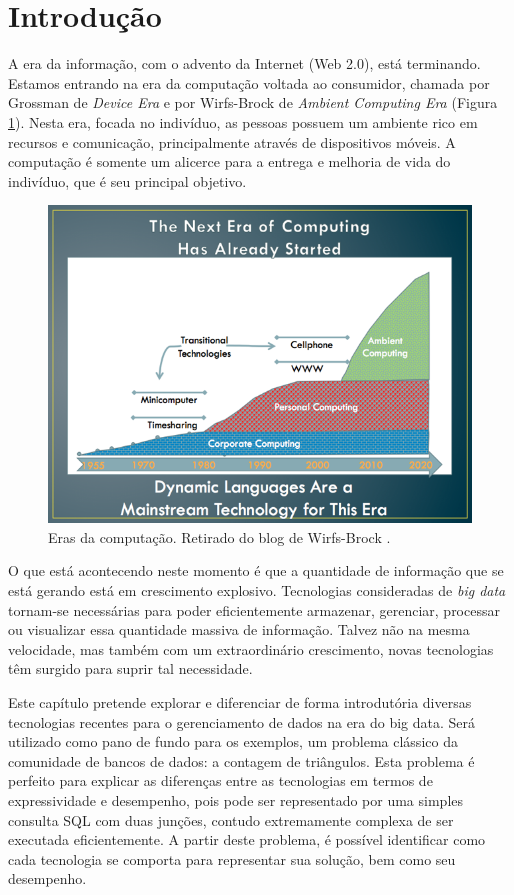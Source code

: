 \section{Introdução}

A era da informação, com o advento da Internet (Web 2.0), está terminando. Estamos entrando na
era da computação voltada ao consumidor, chamada por Grossman de \textit{Device Era}
\citep{grossman2012structure} e por Wirfs-Brock de 
\emph{Ambient Computing Era} \citep{wirfsbrock2011blog} (Figura \ref{fig:ambientcomputing_era}). 
Nesta era, focada no indivíduo, as pessoas possuem um ambiente rico em recursos e comunicação, 
principalmente através de dispositivos móveis. A computação é somente um alicerce para a entrega 
e melhoria de vida do indivíduo, que é seu principal objetivo.

\begin{figure}[h]
        \centering
        \includegraphics[width=0.7\linewidth]{3eras-medium.png}
        \caption{Eras da computação. Retirado do blog de Wirfs-Brock \citep{wirfsbrock2011blog}.}
        \label{fig:ambientcomputing_era}
\end{figure}


O que está acontecendo neste momento é que a quantidade de informação que se está gerando 
está em crescimento explosivo. Tecnologias consideradas de \emph{big data} tornam-se 
necessárias para poder eficientemente armazenar, gerenciar, processar ou
visualizar essa quantidade massiva de informação. Talvez não na mesma velocidade, mas 
também com um extraordinário crescimento, novas tecnologias têm surgido para suprir tal
necessidade.

Este capítulo pretende explorar e diferenciar de forma introdutória diversas tecnologias recentes
para o gerenciamento de dados na era do big data. Será utilizado como pano de fundo para os
exemplos, um problema clássico da comunidade de bancos de dados: a contagem de triângulos.
Esta problema é perfeito para explicar as diferenças entre as tecnologias em termos de
expressividade e desempenho, pois pode ser representado por uma simples consulta SQL com
duas junções, contudo extremamente complexa de ser executada eficientemente. A partir deste
problema, é possível identificar como cada tecnologia se comporta para representar sua solução,
bem como seu desempenho. 

